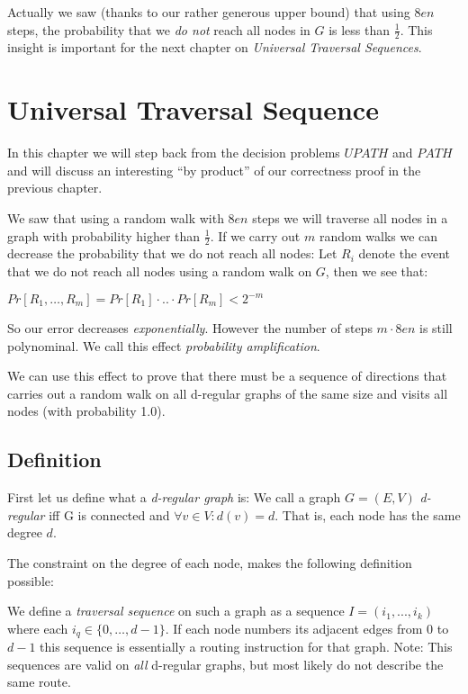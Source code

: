 Actually we saw (thanks to our rather generous upper bound) that using
$8en$ steps, the probability that we \emph{do not} reach all nodes in
$G$ is less than $\frac{1}{2}$. This insight is important for the next
chapter on \emph{Universal Traversal Sequences}.

\chapter{Universal Traversal
Sequence}\label{universal-traversal-sequence}

In this chapter we will step back from the decision problems $UPATH$ and
$PATH$ and will discuss an interesting ``by product'' of our correctness
proof in the previous chapter.

We saw that using a random walk with $8en$ steps we will traverse all
nodes in a graph with probability higher than $\frac{1}{2}$. If we carry
out $m$ random walks we can decrease the probability that we do not
reach all nodes: Let $R_i$ denote the event that we do not reach all
nodes using a random walk on $G$, then we see that:

$Pr[R_1, \dots, R_m] = Pr[R_1] \cdot .. \cdot Pr[R_m] < 2^{-m}$

So our error decreases \emph{exponentially}. However the number of steps
$m \cdot 8en$ is still polynominal. We call this effect
\emph{probability amplification}.

We can use this effect to prove that there must be a sequence of
directions that carries out a random walk on all d-regular graphs of the
same size and visits all nodes (with probability 1.0).

\section{Definition}\label{definition}

First let us define what a \emph{d-regular graph} is: We call a graph
$G = (E, V)$ \emph{d-regular} iff G is connected and
$\forall v \in V: d(v) = d$. That is, each node has the same degree $d$.

The constraint on the degree of each node, makes the following
definition possible:

We define a \emph{traversal sequence} on such a graph as a sequence
$I = (i_1, ..., i_k)$ where each $i_q \in \{0, \dots, d-1\}$. If each
node numbers its adjacent edges from $0$ to $d-1$ this sequence is
essentially a routing instruction for that graph. Note: This sequences
are valid on \emph{all} d-regular graphs, but most likely do not
describe the same route.

